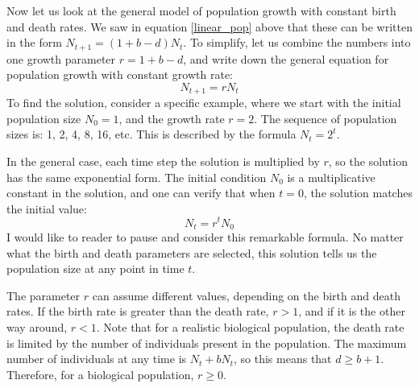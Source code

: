 \documentclass[11pt]{book}
\begin{document}
Now let us look at the general model of population growth with constant birth and death rates. We saw in equation \ref{linear_pop} above that these can be written in the form $N_{t+1} = (1 + b - d) N_t$. To simplify, let us combine the numbers into one growth parameter $r = 1 + b - d$, and write down the general equation for population growth with constant growth rate:
$$ N_{t+1} =  rN_t $$
To find the solution, consider a specific example, where we start with the initial population size $N_0 = 1$, and the growth rate $r=2$. The sequence of population sizes is: 1, 2, 4, 8, 16, etc. This is described by the formula $N_t = 2^t$.


In the general case, each time step the solution is multiplied by $r$, so the solution has the same exponential form. The initial condition $N_0$ is a multiplicative constant in the solution, and one can verify that when $t=0$, the solution matches the initial value:
\begin{equation}
N_t  = r^t N_0
\label{eq:lin_discrete_sol}
\end{equation}
I would like to reader to pause and consider this remarkable formula. No matter what the birth and death parameters are selected, this solution tells us  the population size at any point in time $t$.

The parameter $r$ can assume different values, depending on the birth and death rates. If the birth rate is greater than the death rate, $r > 1$, and if it is the other way around, $r < 1$. Note that for a realistic biological population, the death rate is limited by the number of individuals present in the population. The maximum number of individuals at any time is $N_t  + bN_t$, so this means that $d \geq b +1$. Therefore, for a biological population, $r \geq 0$.
\end{document}
